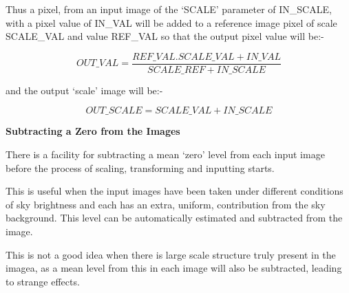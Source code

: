 {{ Thus a pixel, from an input image of the `SCALE' parameter of IN\_SCALE,
 with a pixel value of IN\_VAL will be added to a reference image pixel
 of scale SCALE\_VAL and value REF\_VAL so that the output pixel value
 will be:-
                                                                               
$$    OUT\_VAL = \frac{REF\_VAL.SCALE\_VAL + IN\_VAL}{SCALE\_REF + IN\_SCALE}$$
                                                                               
 and the output `scale' image will be:-
                                                                               
 $$   OUT\_SCALE = SCALE\_VAL + IN\_SCALE $$
                                                                               
                                                                               
{\hspace*{4ex} \bf Subtracting a Zero from the Images}
                                                                               
 There is a facility for subtracting a mean `zero' level from each input
 image before the process of scaling, transforming and inputting starts.
                                                                               
 This is useful when the input images have been taken under different
 conditions of sky brightness and each has an extra, uniform,
 contribution from the sky background. This level can be automatically
 estimated and subtracted from the image.
                                                                               
 This is not a good idea when there is large scale structure truly
 present in the imagea, as a mean level from this in each image will
 also be subtracted, leading to strange effects.
                                                                               
}}

